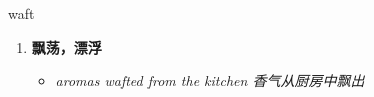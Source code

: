 
\begin{frame}
{\huge waft}
\begin{center}
\begin{enumerate}\Large
  \item \textbf{飘荡，漂浮}
  \begin{itemize}
    \item \em{\Large{aromas wafted from the kitchen 香气从厨房中飘出}}
  \end{itemize}
\end{enumerate}
\end{center}
\end{frame}
